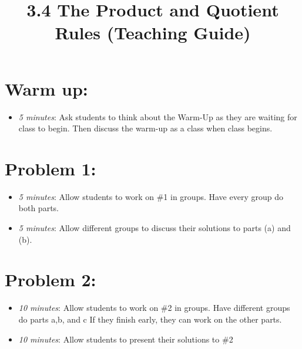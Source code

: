\documentclass[handout,nooutcomes]{ximera}
\title{3.4 The Product and Quotient Rules (Teaching Guide)}
\begin{document}
\begin{abstract}		\end{abstract}
\maketitle


\section*{Warm up:} 
	
	\begin{itemize}
	
	\item  \emph{5 minutes}:  Ask students to think about the Warm-Up as they are waiting for class to begin.  Then discuss the warm-up as a class when class begins.
	
	
	
	\end{itemize}


\section*{Problem 1:}

	\begin{itemize}
	
	\item  \emph{5 minutes}:  Allow students to work on \#1 in groups.  Have every group do both parts.
		
	\item  \emph{5 minutes}:  Allow different groups to discuss their solutions to parts (a) and (b).  
			
	\end{itemize}
	
	
	
\section*{Problem 2:}

	\begin{itemize}
	
	\item  \emph{10 minutes}:  Allow students to work on \#2 in groups.  Have different groups do parts a,b, and c  If they finish early, they can work on the other parts.
	
	\item  \emph{10 minutes}:  Allow students to present their solutions to \#2
	
	\end{itemize}
	
\end{document}
